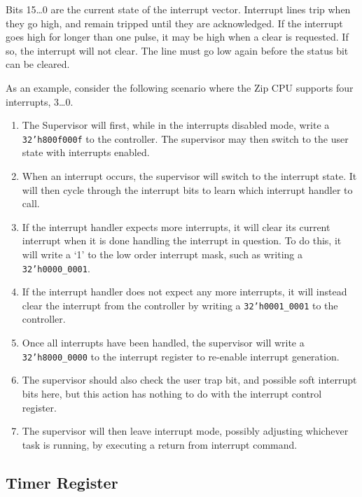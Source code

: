 \documentclass{gqtekspec}
\begin{document}
Bits 15\ldots 0 are the current state of the interrupt vector.  Interrupt lines
trip when they go high, and remain tripped until they are acknowledged.  If
the interrupt goes high for longer than one pulse, it may be high when a clear
is requested.  If so, the interrupt will not clear.  The line must go low
again before the status bit can be cleared.

As an example, consider the following scenario where the Zip CPU supports four
interrupts, 3\ldots0.
\begin{enumerate}
\item The Supervisor will first, while in the interrupts disabled mode,
	write a {\tt 32'h800f000f} to the controller.  The supervisor may then
	switch to the user state with interrupts enabled.
\item When an interrupt occurs, the supervisor will switch to the interrupt
	state.  It will then cycle through the interrupt bits to learn which
	interrupt handler to call.
\item If the interrupt handler expects more interrupts, it will clear its
	current interrupt when it is done handling the interrupt in question.
	To do this, it will write a `1' to the low order interrupt mask,
	such as writing a {\tt 32'h0000\_0001}.
\item If the interrupt handler does not expect any more interrupts, it will
	instead clear the interrupt from the controller by writing a 
	{\tt 32'h0001\_0001} to the controller.
\item Once all interrupts have been handled, the supervisor will write a
	{\tt 32'h8000\_0000} to the interrupt register to re-enable interrupt
	generation.
\item The supervisor should also check the user trap bit, and possible soft
	interrupt bits here, but this action has nothing to do with the
	interrupt control register.
\item The supervisor will then leave interrupt mode, possibly adjusting
	whichever task is running, by executing a return from interrupt
	command.
\end{enumerate}

\subsection{Timer Register}
\end{document}
